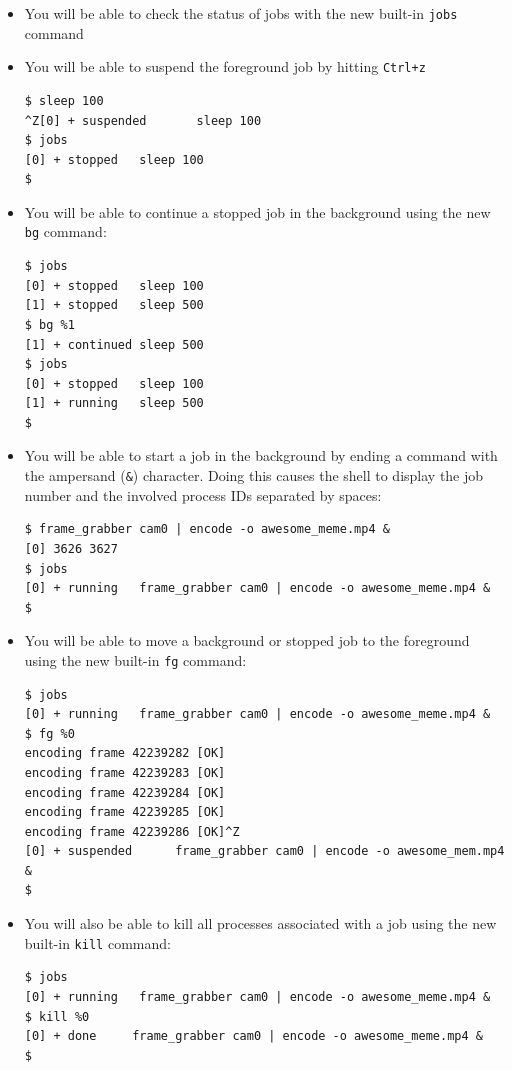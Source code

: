 \documentclass[10pt]{article}
\begin{document}
\begin{itemize}
    \item You will be able to check the status of jobs with the new built-in \texttt{jobs} command

    \item You will be able to suspend the foreground job by hitting \texttt{Ctrl+z}

\begin{verbatim}
$ sleep 100
^Z[0] + suspended       sleep 100
$ jobs
[0] + stopped   sleep 100
$
\end{verbatim}

    \item You will be able to continue a stopped job in the background using the new \texttt{bg} command:

\begin{verbatim}
$ jobs
[0] + stopped   sleep 100
[1] + stopped   sleep 500
$ bg %1
[1] + continued sleep 500
$ jobs
[0] + stopped   sleep 100
[1] + running   sleep 500
$
\end{verbatim}

    \item You will be able to start a job in the background by ending a
        command with the ampersand (\texttt{\&}) character.  Doing this
        causes the shell to display the job number and the involved process
        IDs separated by spaces:

\begin{verbatim}
$ frame_grabber cam0 | encode -o awesome_meme.mp4 &
[0] 3626 3627
$ jobs
[0] + running   frame_grabber cam0 | encode -o awesome_meme.mp4 &
$
\end{verbatim}

\pagebreak

    \item You will be able to move a background or stopped job to the
        foreground using the new built-in \texttt{fg} command:

\begin{verbatim}
$ jobs
[0] + running   frame_grabber cam0 | encode -o awesome_meme.mp4 &
$ fg %0
encoding frame 42239282 [OK]
encoding frame 42239283 [OK]
encoding frame 42239284 [OK]
encoding frame 42239285 [OK]
encoding frame 42239286 [OK]^Z
[0] + suspended      frame_grabber cam0 | encode -o awesome_mem.mp4 &
$
\end{verbatim}

    \item You will also be able to kill all processes associated with a
        job using the new built-in \texttt{kill} command:

\begin{verbatim}
$ jobs
[0] + running   frame_grabber cam0 | encode -o awesome_meme.mp4 &
$ kill %0
[0] + done     frame_grabber cam0 | encode -o awesome_meme.mp4 &
$
\end{verbatim}

\end{itemize}
\end{document}
